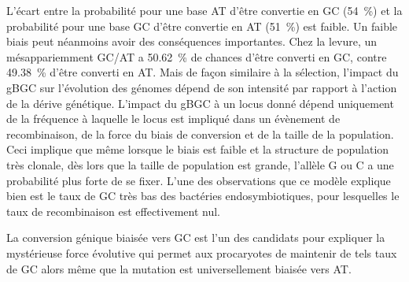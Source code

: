 L'écart entre la probabilité pour une base AT d'être convertie en GC
(\SI{54}{\percent}) et la probabilité pour une base GC d'être convertie en AT
(\SI{51}{\percent}) est faible. Un faible biais peut néanmoins avoir des
conséquences importantes. Chez la levure, un mésappariemment GC/AT a
\SI{50.62}{\percent} de chances d'être converti en GC, contre
\SI{49.38}{\percent} d'être converti en
AT\cite{mancera_high-resolution_2008,duret_biased_2009}. Mais de façon similaire
à la sélection, l'impact du gBGC sur l'évolution des génomes dépend de son
intensité par rapport à l'action de la dérive génétique. L'impact du gBGC à un
locus donné dépend uniquement de la fréquence à laquelle le locus est impliqué
dans un évènement de recombinaison, de la force du biais de conversion et de la
taille de la
population\cite{nagylaki_evolution_1983,lassalle_gc-content_2015,duret_biased_2009,duret_impact_2008}.
Ceci implique que même lorsque le biais est faible et la structure de population
très clonale, dès lors que la taille de population est grande, l'allèle G ou C a
une probabilité plus forte de se fixer. L'une des observations que ce modèle
explique bien est le taux de GC très bas des bactéries endosymbiotiques, pour
lesquelles le taux de recombinaison est effectivement
nul\cite{moran_genomics_2008}.

La conversion génique biaisée vers GC est l'un des candidats pour expliquer la
mystérieuse force évolutive qui permet aux procaryotes de maintenir de tels taux
de GC alors même que la mutation est universellement biaisée vers
AT\cite{hildebrand_evidence_2010,hershberg_evidence_2010}.

\afterpage{\blankpage}
